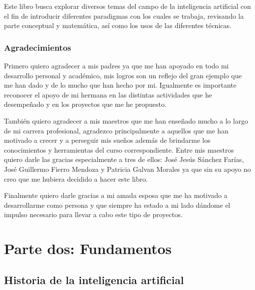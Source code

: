 \documentclass[11pt,fleqn]{book} %
\begin{document}
Este libro busca explorar diversos temas del campo de la inteligencia artificial con el fin de introducir diferentes paradigmas con los cuales se trabaja, revisando la parte conceptual y matemática, así como los usos de las diferentes técnicas.


\section{Agradecimientos}

Primero quiero agradecer a mis padres ya que me han apoyado en todo mi desarrollo personal y académico, mis logros son un reflejo del gran ejemplo que me han dado y de lo mucho que han hecho por mi. Igualmente es importante reconocer el apoyo de mi hermana en las distintas actividades que he desempeñado y en los proyectos que me he propuesto.

También quiero agradecer a mis maestros que me han enseñado mucho a lo largo de mi carrera profesional, agradezco principalmente a aquellos que me han motivado a crecer y a perseguir mis sueños además de brindarme los conocimientos y herramientas del curso correspondiente. Entre mis maestros quiero darle las gracias especialmente a tres de ellos: José Jesús Sánchez Farías, José Guillermo Fierro Mendoza y Patricia Galvan Morales ya que sin su apoyo no creo que me hubiera decidido a hacer este libro.

Finalmente quiero darle gracias a mi amada esposa que me ha motivado a desarrollarme como persona y que siempre ha estado a mi lado dándome el impulso necesario para llevar a cabo este tipo de proyectos. 


\part{Parte dos: Fundamentos}



\chapter{Historia de la inteligencia artificial}
\end{document}
